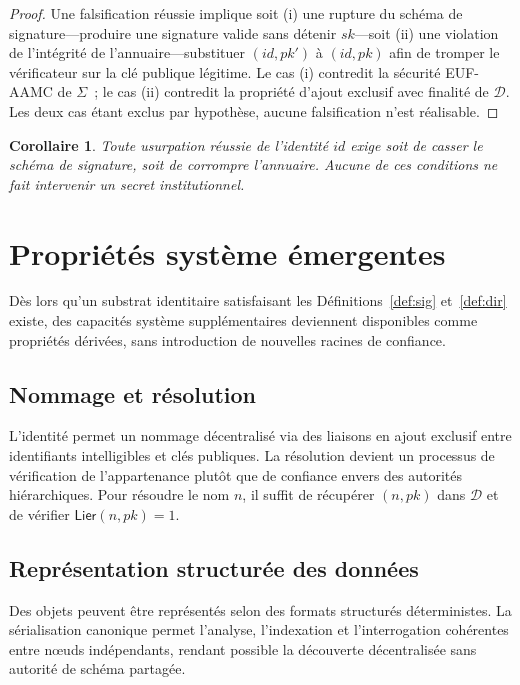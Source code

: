 \documentclass[11pt,a4paper]{article}
\newtheorem{corollaire}[theoreme]{Corollaire}
\begin{document}
\begin{proof}
Une falsification réussie implique soit (i) une rupture du schéma de
signature---produire une signature valide sans détenir $sk$---soit (ii) une
violation de l'intégrité de l'annuaire---substituer $(id, pk')$ à $(id, pk)$
afin de tromper le vérificateur sur la clé publique légitime.  Le cas (i)
contredit la sécurité EUF-AAMC de $\Sigma$~; le cas (ii) contredit la
propriété d'ajout exclusif avec finalité de $\mathcal{D}$.  Les deux cas
étant exclus par hypothèse, aucune falsification n'est réalisable.
\end{proof}

\begin{corollaire}
  Toute usurpation réussie de l'identité $id$ exige soit de casser le
  schéma de signature, soit de corrompre l'annuaire.  Aucune de ces
  conditions ne fait intervenir un secret institutionnel.
\end{corollaire}

\section{Propriétés système émergentes}

Dès lors qu'un substrat identitaire satisfaisant les
Définitions~\ref{def:sig} et~\ref{def:dir} existe, des capacités système
supplémentaires deviennent disponibles comme propriétés dérivées, sans
introduction de nouvelles racines de confiance.

\subsection{Nommage et résolution}

L'identité permet un nommage décentralisé via des liaisons en ajout exclusif
entre identifiants intelligibles et clés publiques.  La résolution devient un
processus de vérification de l'appartenance plutôt que de confiance envers
des autorités hiérarchiques.  Pour résoudre le nom $n$, il suffit de
récupérer $(n, pk)$ dans $\mathcal{D}$ et de vérifier $\mathsf{Lier}(n, pk) = 1$.

\subsection{Représentation structurée des données}

Des objets peuvent être représentés selon des formats structurés déterministes.
La sérialisation canonique permet l'analyse, l'indexation et l'interrogation
cohérentes entre nœuds indépendants, rendant possible la découverte
décentralisée sans autorité de schéma partagée.
\end{document}
